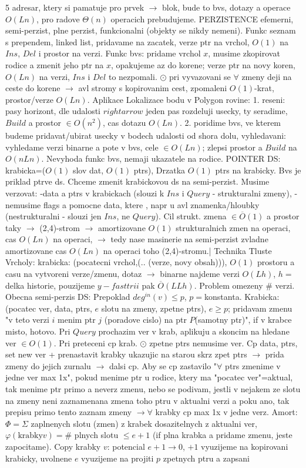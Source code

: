 \documentclass[8pt]{extarticle}
\begin{document}
\begin{multicols*}{5}
adresar, ktery si pamatuje pro prvek $\rightarrow$ blok, bude to bvs, dotazy a operace $O(Ln)$, pro radove $\Theta(n)$ operacich prebudujeme. PERZISTENCE efemerni, semi-perzist, plne perzist, funkcionalni (objekty se nikdy nemeni). Funkc seznam s prependem, linked list, pridavame na zacatek, verze ptr na vrchol, $O(1)$ na $Ins$, $Del$ i prostor na verzi. Funkc bvs: pridame vrchol $x$, musime zkopirovat rodice a zmenit jeho ptr na $x$, opakujeme az do korene; verze ptr na novy koren, $O(Ln)$ na verzi, $Ins$ i $Del$ to nezpomali. 
$\odot$ pri vyvazovani se $\forall$ zmeny deji na ceste do korene $\rightarrow$ avl stromy s kopirovanim cest, zpomaleni $O(1)$-krat, prostor/verze $O(Ln)$. Aplikace Lokalizace bodu v Polygon rovine: 1. reseni: pasy horizont, dle udalosti $rightarrow$ jeden pas rozdeluji usecky, ty seradime, $Build$ a prostor $\in O(n^2)$, cas dotazu $O(Ln)$. 2. poridime bvs, ve kterem budeme pridavat/ubirat usecky v bodech udalosti od shora dolu, vyhledavani: vyhledame verzi binarne a pote v bvs, cele $\in O(Ln)$; zlepsi prostor a $Build$ na $O(nLn)$. Nevyhoda funkc bvs, nemaji ukazatele na rodice. POINTER DS: krabicka=($O(1)$ slov dat, $O(1)$ ptrs), Drzatka $O(1)$ ptrs na krabicky. Bvs je priklad ptrve ds. Chceme zmenit krabickovou ds na semi-perzist. Musime verzovat: -data a ptrs v krabickach (slouzi k $Ins$ i $Query$ - strukturalni zmeny), -nemusime flags a pomocne data, ktere , napr u avl znamenka/hloubky (nestrukturalni - slouzi jen $Ins$, ne $Query$). Cil strukt. zmena $\in \overline{O}(1)$ a prostor taky $\rightarrow$ (2,4)-strom $\rightarrow$ amortizovane $O(1)$ strukturalnich zmen na operaci, cas $O(Ln)$ na operaci, $\rightarrow$ tedy nase masinerie na semi-perzist zvladne amortizovane cas $O(Ln)$ na operaci toho (2,4)-stromu.| Technika Tluste Vrcholy: krabicka: (pocatecni vrchol,(.. (verze, novy obsah))), $O(1)$ prostoru a casu na vytvoreni verze/zmenu, dotaz $\rightarrow$ binarne najdeme verzi $O(Lh)$, $h=$delka historie, pouzijeme $y-fast trii$ pak $\overline{O}(LLh)$. Problem omezeny \# verzi. Obecna semi-perzis DS: Prepoklad $deg^{in}(v) \leq p$, $p=$konstanta. Krabicka: (pocatec ver, data, ptrs, $e$ slotu na zmeny, zpetne ptrs), $e\geq p$; pridavam zmenu "v teto verzi $i$ menim ptr $j$ (poradove cislo) na ptr $P$(samotny ptr)", if v krabce misto, hotovo. Pri $Query$ prochazim ver v krab, aplikuju a skoncim na hledane ver $\in O(1)$. Pri preteceni cp krab. $\odot$ zpetne ptrs nemusime ver. Cp data, ptrs, set new ver + prenastavit krabky ukazujic na starou skrz zpet ptrs $\rightarrow$ prida zmeny do jejich zurnalu $\rightarrow$ dalsi cp. Aby se cp zastavilo "$\forall$ ptrs zmenime v jedne ver max 1x", pokud menime ptr u rodice, ktery ma "pocatec ver"=aktual, tak menime ptr primo a neverz zmenu, nebo se podivam, jestli v nejakem ze slotu na zmeny neni zaznamenana zmena toho ptru v aktualni verzi a poku ano, tak prepisu primo tento zaznam zmeny $\rightarrow \forall$ krabky cp max 1x v jedne verz. Amort: $\Phi= \Sigma$ zaplnenych slotu (zmen) z krabek dosazitelnych z aktualni ver, $\varphi(\text{krabky} v)= \#$ plnych slotu $\leq e+1$ (if plna krabka a pridame zmenu, jeste zapocitame). Copy krabky $v$: potencial $e+1 \rightarrow 0$, $+1$ vyuzijeme na kopirovani krabicky, uvolnene $e$ vyuzijeme na projiti $p$ zpetnych ptru a zapsani 
\end{multicols*}
\end{document}
